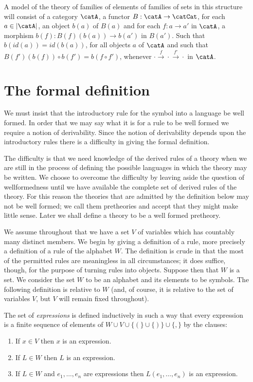 A model of the theory of families of elements of families of sets in this structure will consist of a category $\catA$, a functor $B:\catA\to\catCat$, for each $a\in |\catA|$, an object $b(a)$ of $B(a)$ and for each $f:a\to a'$ in $\catA$, a morphism $b(f): B(f)(b(a))\to b(a')$ in $B(a')$.
%
Such that $b(id(a)) = id(b(a))$, for all objects $a$ of $\catA$ and such that $B(f')(b(f))\circ b(f') = b(f\circ f')$, whenever $\cdot\xrightarrow{f}\cdot\xrightarrow{f'}\cdot$ in $\catA$.

\section{The formal definition} \label{sec:source-1-6}
We must insist that the introductory rule for the symbol into a language be well formed.
%
In order that we may say what it is for a rule to be well formed we require a notion of derivability.
%
Since the notion of derivability depends upon the introductory rules there is a difficulty in giving the formal definition.

The difficulty is that we need knowledge of the derived rules of a theory when we are still in the process of defining the possible languages in which the theory may be written.
%
We choose to overcome the difficulty by leaving aside the question of wellformedness until we have available the complete set of derived rules of the theory.
%
For this reason the theories that are admitted by the definition below may not be well formed; we call them pretheories and accept that they might make little sense.
%
Later we shall define a theory to be a well formed pretheory.

We assume throughout that we have a set $V$ of variables which has countably many distinct members.
%
We begin by giving a definition of a rule, more precisely a definition of a rule of the alphabet $W$.
%
The definition is crude in that the most of the permitted rules are meaningless in all circumstances; it does suffice, though, for the purpose of turning rules into objects. Suppose then that $W$ is a set.
%
We consider the set $W$ to be an alphabet and its elements to be symbols.
%
The following definition is relative to $W$ (and, of course, it is relative to the set of variables $V$, but $V$ will remain fixed throughout).

The set of \emph{expressions} is defined inductively in such a way that every expression is a finite sequence of elements of $W\cup V\cup \{(\}\cup\{)\}\cup\{,\}$ by the clauses:
%
\begin{enumerate}
  \item If $x\in V$ then $x$ is an expression.
  \item If $L\in W$ then $L$ is an expression.
  \item If $L\in W$ and $e_1,\ldots,e_n$ are expressions then $L(e_1,\ldots,e_n)$ is an expression.
\end{enumerate}

